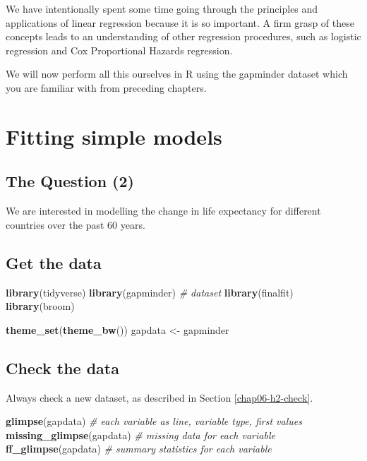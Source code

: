 \documentclass[
  12pt,
  krantz2]{krantz}
\makeatletter
\newenvironment{Shaded}{\begin{snugshade}}{\end{snugshade}}
\newcommand{\CommentTok}[1]{\textcolor[rgb]{0.56,0.35,0.01}{\textit{#1}}}
\newcommand{\KeywordTok}[1]{\textcolor[rgb]{0.13,0.29,0.53}{\textbf{#1}}}
\newcommand{\NormalTok}[1]{#1}
\newcommand{\StringTok}[1]{\textcolor[rgb]{0.31,0.60,0.02}{#1}}
\newenvironment{kframe}{%
\medskip{}
\setlength{\fboxsep}{.8em}
 \def\at@end@of@kframe{}%
 \ifinner\ifhmode%
  \def\at@end@of@kframe{\end{minipage}}%
  \begin{minipage}{\columnwidth}%
 \fi\fi%
 \def\FrameCommand##1{\hskip\@totalleftmargin \hskip-\fboxsep
 \colorbox{shadecolor}{##1}\hskip-\fboxsep
     \hskip-\linewidth \hskip-\@totalleftmargin \hskip\columnwidth}%
 \MakeFramed {\advance\hsize-\width
   \@totalleftmargin\z@ \linewidth\hsize
   \@setminipage}}%
 {\par\unskip\endMakeFramed%
 \at@end@of@kframe}
\renewenvironment{Shaded}{\begin{kframe}}{\end{kframe}}
\makeatother
\begin{document}
We have intentionally spent some time going through the principles and applications of linear regression because it is so important.
A firm grasp of these concepts leads to an understanding of other regression procedures, such as logistic regression and Cox Proportional Hazards regression.

We will now perform all this ourselves in R using the gapminder dataset which you are familiar with from preceding chapters.

\hypertarget{fitting-simple-models}{%
\section{Fitting simple models}\label{fitting-simple-models}}

\hypertarget{the-question-2}{%
\subsection{The Question (2)}\label{the-question-2}}

We are interested in modelling the change in life expectancy for different countries over the past 60 years.

\hypertarget{get-the-data-2}{%
\subsection{Get the data}\label{get-the-data-2}}

\begin{Shaded}
\begin{Highlighting}[]
\KeywordTok{library}\NormalTok{(tidyverse)}
\KeywordTok{library}\NormalTok{(gapminder) }\CommentTok{# dataset}
\KeywordTok{library}\NormalTok{(finalfit)}
\KeywordTok{library}\NormalTok{(broom)}

\KeywordTok{theme_set}\NormalTok{(}\KeywordTok{theme_bw}\NormalTok{())}
\NormalTok{gapdata <-}\StringTok{ }\NormalTok{gapminder}
\end{Highlighting}
\end{Shaded}

\hypertarget{check-the-data}{%
\subsection{Check the data}\label{check-the-data}}

Always check a new dataset, as described in Section \ref{chap06-h2-check}.

\begin{Shaded}
\begin{Highlighting}[]
\KeywordTok{glimpse}\NormalTok{(gapdata) }\CommentTok{# each variable as line, variable type, first values}
\KeywordTok{missing_glimpse}\NormalTok{(gapdata) }\CommentTok{# missing data for each variable}
\KeywordTok{ff_glimpse}\NormalTok{(gapdata) }\CommentTok{# summary statistics for each variable}
\end{Highlighting}
\end{Shaded}
\end{document}
